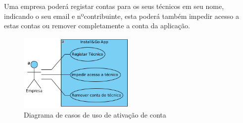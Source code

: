 Uma empresa poderá registar contas para os seus técnicos em seu nome, indicando o seu email e nºcontribuinte,
esta poderá também impedir acesso a estas contas ou remover completamente a conta da aplicação.

\begin{figure}[htb]
    \centering
    \includegraphics[width=0.5\textwidth]{images/diagramas/casos_de_uso/use_case_rec_humanos.png}
    \caption{Diagrama de casos de uso de ativação de conta}
    \label{fig:19}
\end{figure}